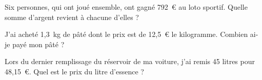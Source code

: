 \begin{myenumerate}
 \item Six personnes, qui ont joué ensemble, ont gagné 792~\textgreek{\euro} au loto sportif. Quelle somme d'argent revient à chacune d'elles ?
 \item J'ai acheté 1,3~kg de pâté dont le prix est de 12,5~\textgreek{\euro} le kilogramme. Combien ai-je payé mon pâté ?
 \item Lors du dernier remplissage du réservoir de ma voiture, j'ai remis 45 litres pour 48,15~\textgreek{\euro}. Quel est le prix du litre d'essence ?
\end{myenumerate}